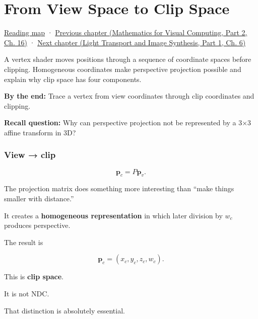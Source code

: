 \chapter{From View Space to Clip Space}\label{03-visual-computing-i-ch013-from-view-space-to-clip-space}\hypertarget{03-visual-computing-i-ch013}{}\label{stagechapter:03-visual-computing-i-ch013}

\hypertarget{03-visual-computing-i-ch013-from-view-space-to-clip-space}{}

\hyperref[volume-reading-map]{Reading map} · \href{../02-Mathematics-for-Visual-Computing-P02/main.pdf\#nameddest=03-visual-computing-i-ch012-probability-statistics-and-uncertainty}{Previous chapter (Mathematics for Visual Computing, Part 2, Ch. 16)} · \href{../04-Light-Transport-and-Image-Synthesis-P01/main.pdf\#nameddest=03-visual-computing-i-ch014-transparency-blending-and-visibility}{Next chapter (Light Transport and Image Synthesis, Part 1, Ch. 6)}

A vertex shader moves positions through a sequence of coordinate spaces before clipping. Homogeneous coordinates make perspective projection possible and explain why clip space has four components.

\textbf{By the end:} Trace a vertex from view coordinates through clip coordinates and clipping.

\textbf{Recall question:} Why can perspective projection not be represented by a 3×3 affine transform in 3D?

\subsection{View → clip}\label{03-visual-computing-i-ch013-view-clip}

\hypertarget{03-visual-computing-i-ch013-view-clip}{}

\[
\mathbf p_c=P\mathbf p_v.
\]

The projection matrix does something more interesting than ``make things smaller with distance.''

It creates a \textbf{homogeneous representation} in which later division by \(w_c\) produces perspective.

The result is

\[
\mathbf p_c=
(x_c,y_c,z_c,w_c).
\]

This is \textbf{clip space}.

It is not NDC.

That distinction is absolutely essential.

